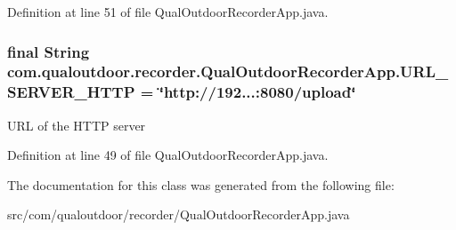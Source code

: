 Definition at line 51 of file Qual\-Outdoor\-Recorder\-App.\-java.

\hypertarget{classcom_1_1qualoutdoor_1_1recorder_1_1QualOutdoorRecorderApp_a6045fe80259e1789ab9d7806fc8c2178}{
\subsubsection[{U\-R\-L\-\_\-\-S\-E\-R\-V\-E\-R\-\_\-\-H\-T\-T\-P}]{\setlength{\rightskip}{0pt plus 5cm}final String com.\-qualoutdoor.\-recorder.\-Qual\-Outdoor\-Recorder\-App.\-U\-R\-L\-\_\-\-S\-E\-R\-V\-E\-R\-\_\-\-H\-T\-T\-P = \char`\"{}http\-://192...\-:8080/upload\char`\"{}\hspace{0.3cm}{\ttfamily [static]}}}\label{classcom_1_1qualoutdoor_1_1recorder_1_1QualOutdoorRecorderApp_a6045fe80259e1789ab9d7806fc8c2178}
U\-R\-L of the H\-T\-T\-P server 

Definition at line 49 of file Qual\-Outdoor\-Recorder\-App.\-java.



The documentation for this class was generated from the following file\-:\begin{DoxyCompactItemize}
\item 
src/com/qualoutdoor/recorder/Qual\-Outdoor\-Recorder\-App.\-java\end{DoxyCompactItemize}
